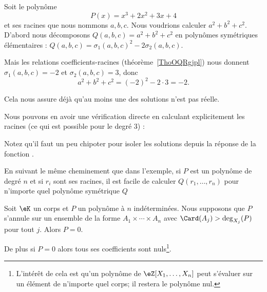 
\begin{example} \label{ExHIfHhBr}
    Soit le polynôme
    \begin{equation}
        P(x)=x^3+2x^2+3x+4
    \end{equation}
    et ses racines que nous nommons \( a,b,c\). Nous voudrions calculer \( a^2+b^2+c^2\). D'abord nous décomposons \( Q(a,b,c)=a^2+b^2+c^2\) en polynômes symétriques élémentaires : \( Q(a,b,c)=\sigma_1(a,b,c)^2-2\sigma_2(a,b,c)\).

    Mais les relations coefficients-racines (théorème~\ref{ThoOQRgjpl}) nous donnent \( \sigma_1(a,b,c)=-2\) et \( \sigma_2(a,b,c)=3\), donc
    \begin{equation}
        a^2+b^2+c^2=(-2)^2-2\cdot 3=-2.
    \end{equation}

    Cela nous assure déjà qu'au moins une des solutions n'est pas réelle.

    Nous pouvons en avoir une vérification directe en calculant explicitement les racines (ce qui est possible pour le degré \( 3\)) :
    

    Notez qu'il faut un peu chipoter pour isoler les solutions depuis la réponse de la fonction .
\end{example}

En suivant le même cheminement que dans l'exemple, si \( P\) est un polynôme de degré \( n\) et si \( r_i\) sont ses racines, il est facile de calculer \( Q(r_1,\ldots, r_n)\) pour n'importe quel polynôme symétrique \( Q\)

\begin{proposition} \label{PropTETooGuBYQf}
    Soit \( \eK\) un corps et \( P\) un polynôme à \( n\) indéterminées. Nous supposons que \(P\) s'annule sur un ensemble de la forme \( A_1\times\cdots\times A_n\) avec \( \Card(A_j)>\deg_{X_j}(P)\) pour tout \( j\). Alors \( P=0\).

    De plus si \( P=0\) alors tous ses coefficients sont nuls\footnote{L'intérêt de cela est qu'un polynôme de \( \eZ[X_1,\ldots, X_n]\) peut s'évaluer sur un élément de n'importe quel corps; il restera le polynôme nul.}.
\end{proposition}

